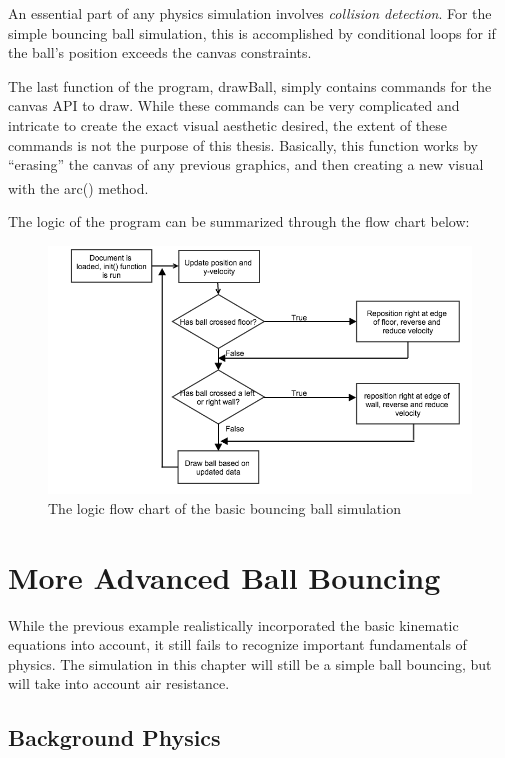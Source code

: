 An essential part of any physics simulation involves \textit{collision detection}.  For the simple bouncing ball simulation, this is accomplished by conditional loops for if the ball's position exceeds the canvas constraints.  


The last function of the program, drawBall, simply contains commands for the canvas API to draw.  While these commands can be very complicated and intricate to create the exact visual aesthetic desired, the extent of these commands is not the purpose of this thesis.  Basically, this function works by ``erasing'' the canvas of any previous graphics, and then creating a new visual with the arc() method.\textsuperscript{\cite{basichtml5}}   

The logic of the program can be summarized through the flow chart below:


\begin{figure}[h] 
	\centering
		\includegraphics[width=15cm]{Figures/basicbouncingball.png}

	\caption{The logic flow chart of the basic bouncing ball simulation}
	\label{fig:basicbouncingball}
\end{figure}




\section{More Advanced Ball Bouncing}

While the previous example realistically incorporated the basic kinematic equations into account, it still fails to recognize important fundamentals of physics.  The simulation in this chapter will still be a simple ball bouncing, but will take into account air resistance.

\subsection{Background Physics}

